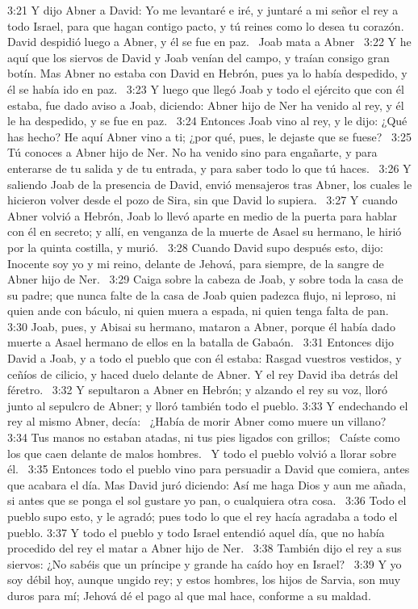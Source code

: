 3:21 Y dijo Abner a David: Yo me levantaré e iré, y juntaré a mi señor el rey a todo Israel, para que hagan contigo pacto, y tú reines como lo desea tu corazón. David despidió luego a Abner, y él se fue en paz.  
Joab mata a Abner  
3:22 Y he aquí que los siervos de David y Joab venían del campo, y traían consigo gran botín. Mas Abner no estaba con David en Hebrón, pues ya lo había despedido, y él se había ido en paz.  
3:23 Y luego que llegó Joab y todo el ejército que con él estaba, fue dado aviso a Joab, diciendo: Abner hijo de Ner ha venido al rey, y él le ha despedido, y se fue en paz.  
3:24 Entonces Joab vino al rey, y le dijo: ¿Qué has hecho? He aquí Abner vino a ti; ¿por qué, pues, le dejaste que se fuese?  
3:25 Tú conoces a Abner hijo de Ner. No ha venido sino para engañarte, y para enterarse de tu salida y de tu entrada, y para saber todo lo que tú haces.  
3:26 Y saliendo Joab de la presencia de David, envió mensajeros tras Abner, los cuales le hicieron volver desde el pozo de Sira, sin que David lo supiera.  
3:27 Y cuando Abner volvió a Hebrón, Joab lo llevó aparte en medio de la puerta para hablar con él en secreto; y allí, en venganza de la muerte de Asael su hermano, le hirió por la quinta costilla, y murió.  
3:28 Cuando David supo después esto, dijo: Inocente soy yo y mi reino, delante de Jehová, para siempre, de la sangre de Abner hijo de Ner.  
3:29 Caiga sobre la cabeza de Joab, y sobre toda la casa de su padre; que nunca falte de la casa de Joab quien padezca flujo, ni leproso, ni quien ande con báculo, ni quien muera a espada, ni quien tenga falta de pan.  
3:30 Joab, pues, y Abisai su hermano, mataron a Abner, porque él había dado muerte a Asael hermano de ellos en la batalla de Gabaón.  
3:31 Entonces dijo David a Joab, y a todo el pueblo que con él estaba: Rasgad vuestros vestidos, y ceñíos de cilicio, y haced duelo delante de Abner. Y el rey David iba detrás del féretro.  
3:32 Y sepultaron a Abner en Hebrón; y alzando el rey su voz, lloró junto al sepulcro de Abner; y lloró también todo el pueblo. 
3:33 Y endechando el rey al mismo Abner, decía:  
¿Había de morir Abner como muere un villano?  
3:34 Tus manos no estaban atadas, ni tus pies ligados con grillos;  
Caíste como los que caen delante de malos hombres.  
Y todo el pueblo volvió a llorar sobre él.  
3:35 Entonces todo el pueblo vino para persuadir a David que comiera, antes que acabara el día. Mas David juró diciendo: Así me haga Dios y aun me añada, si antes que se ponga el sol gustare yo pan, o cualquiera otra cosa.  
3:36 Todo el pueblo supo esto, y le agradó; pues todo lo que el rey hacía agradaba a todo el pueblo. 
3:37 Y todo el pueblo y todo Israel entendió aquel día, que no había procedido del rey el matar a Abner hijo de Ner.  
3:38 También dijo el rey a sus siervos: ¿No sabéis que un príncipe y grande ha caído hoy en Israel?  
3:39 Y yo soy débil hoy, aunque ungido rey; y estos hombres, los hijos de Sarvia, 
son muy duros para mí; Jehová dé el pago al que mal hace, conforme a su maldad.  
